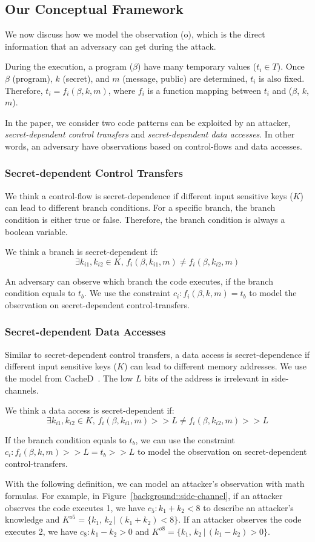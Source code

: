\subsection{Our Conceptual Framework}
\label{side-channel:condition}
We now discuss how we model the observation (o), which is the direct information
that an adversary can get during the attack.

During the execution, a program ($\beta$) have many temporary values ($t_i \in
T$). Once $\beta$ (program), $k$ (secret), and $m$ (message, public) are
determined, $t_i$ is also fixed. Therefore, $ t_i = f_i(\beta, k, m)$, where $f_
i$ is a function mapping between $t_i$ and ($\beta$, $k$, $m$).

In the paper, we consider two code patterns can be exploited by an attacker,
\emph{secret-dependent control transfers} and \emph{secret-dependent data
accesses}. In other words, an adversary have observations based on control-flows
and data accesses.

\subsubsection{Secret-dependent Control Transfers}
We think a control-flow is secret-dependence if different input sensitive keys
($K$) can lead to different branch conditions. For a specific branch, the branch
condition is either true or false. Therefore, the branch condition is always a
boolean variable.

We think a branch is secret-dependent if:
$$\exists k_{i1}, k_{i2} \in K, \,f_i(\beta, k_{i1}, m) \neq f_i(\beta, k_{i2}, m)$$

An adversary can observe which branch the code executes, if the branch condition
equals to $t_b$. We use the constraint $c_i : f_i(\beta, k, m) = t_b$ to model
the observation on secret-dependent control-transfers.

\subsubsection{Secret-dependent Data Accesses}
Similar to secret-dependent control transfers, a data access is
secret-dependence if different input sensitive keys ($K$) can lead to different
memory addresses. We use the model from CacheD~\cite{203878}. The low $L$ bits
of the address is irrelevant in side-channels.

We think a data access is secret-dependent if:
$$\exists k_{i1}, k_{i2} \in K, \,f_i(\beta, k_{i1}, m) >> L \neq f_i(\beta, k_{i2}, m) >> L$$

If the branch condition equals to $t_b$, we can use the constraint $c_i :
f_i(\beta, k, m) >> L = t_b >> L$ to model the observation on secret-dependent
control-transfers.

With the following definition, we can model an attacker's observation with math
formulas. For example, in Figure~\ref{background::side-channel}, if an attacker
observes the code executes 1, we have $c_5: k_1 + k_2 < 8$ to describe an
attacker's knowledge and $K^{o5} = \{k_1,\, k_2\,|\, (k_1 + k_2) < 8\}$. If an
attacker observes the code executes 2, we have $c_8: k_1 - k_2 > 0$ and $K^{o8}
= \{k_1,\, k_2\,|\, (k_1 - k_2) > 0\}$.
